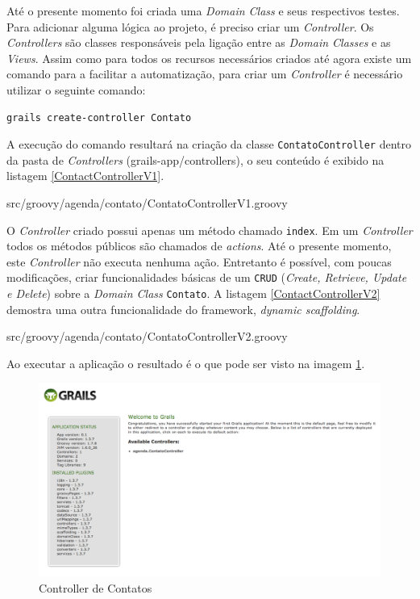 \documentclass[12pt]{article}
\begin{document}
    Até o presente momento foi criada uma \emph{Domain Class} e seus respectivos testes.
    Para adicionar alguma lógica ao projeto, é preciso criar um \emph{Controller}.
    Os \emph{Controllers} são classes responsáveis pela ligação entre as \emph{Domain Classes} 
    e as \emph{Views}. Assim como para todos os recursos necessários criados até 
    agora existe um comando para a facilitar a automatização, para criar um 
    \emph{Controller} é necessário utilizar o seguinte comando:
    
    \begin{lstlisting}[basicstyle={\small \ttfamily}]
          grails create-controller Contato
    \end{lstlisting}
    
    A execução do comando resultará na criação da classe \texttt{ContatoController} dentro
    da pasta de \emph{Controllers} (grails-app/controllers), o seu conteúdo é exibido na
    listagem \ref{ContactControllerV1}.
    
    
                   {src/groovy/agenda/contato/ContatoControllerV1.groovy}
                   
    O \emph{Controller} criado possui apenas um método chamado \texttt{index}.
    Em um \emph{Controller} todos os métodos públicos são chamados de \emph{actions}. 
    Até o presente momento, este \emph{Controller} não executa nenhuma ação. 
    Entretanto é possível, com poucas modificações, criar funcionalidades básicas 
    de um \texttt{CRUD} (\emph{Create, Retrieve, Update e Delete}) sobre a 
    \emph{Domain Class} \texttt{Contato}. A listagem \ref{ContactControllerV2} 
    demostra uma outra funcionalidade do framework, \emph{dynamic scaffolding}. 
    
    
                   {src/groovy/agenda/contato/ContatoControllerV2.groovy}

    
    Ao executar a aplicação o resultado é o que pode ser visto na imagem \ref{fig:contactScaffold1}.

    \begin{figure}[h!]
       \centering
       \includegraphics[width=.7\textwidth]{images/contactControllerScaffold.png}
       \caption{Controller de Contatos}
       \label{fig:contactScaffold1}
   \end{figure}
   
\end{document}
